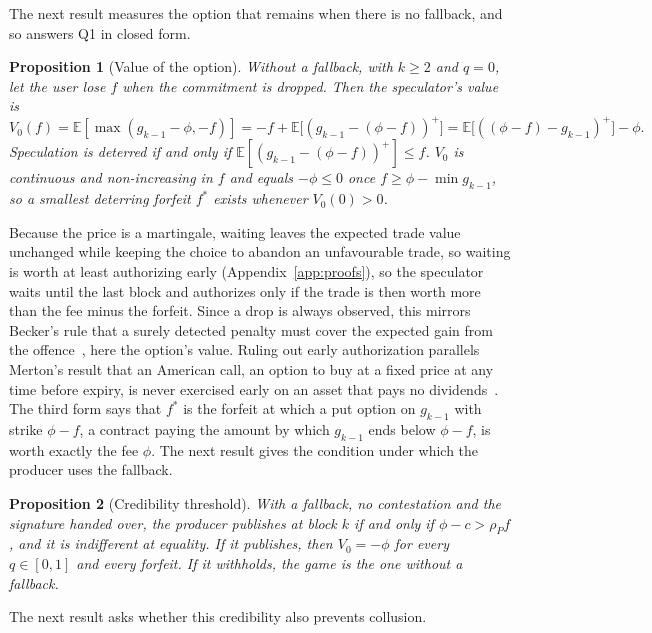 \documentclass[11pt]{article}
\newtheorem{proposition}{Proposition}
\newcommand{\E}{\mathbb{E}}
\begin{document}
The next result measures the option that remains when there is no fallback, and so answers Q1 in closed form.

\begin{proposition}[Value of the option]\label{prop:value}
Without a fallback, with $k\ge2$ and $q=0$, let the user lose $f$ when the commitment is dropped. Then the speculator's value is
\[V_0(f)=\E[\max(g_{k-1}-\phi,-f)]=-f+\E\big[(g_{k-1}-(\phi-f))^+\big]=\E\big[((\phi-f)-g_{k-1})^+\big]-\phi .\]
Speculation is deterred if and only if $\E[(g_{k-1}-(\phi-f))^+]\le f$. $V_0$ is continuous and non-increasing in $f$ and equals $-\phi\le0$ once $f\ge\phi-\min g_{k-1}$, so a smallest deterring forfeit $f^*$ exists whenever $V_0(0)>0$.
\end{proposition}
Because the price is a martingale, waiting leaves the expected trade value unchanged while keeping the choice to abandon an unfavourable trade, so waiting is worth at least authorizing early (Appendix~\ref{app:proofs}), so the speculator waits until the last block and authorizes only if the trade is then worth more than the fee minus the forfeit. Since a drop is always observed, this mirrors Becker's rule that a surely detected penalty must cover the expected gain from the offence~\cite{becker1968crime}, here the option's value. Ruling out early authorization parallels Merton's result that an American call, an option to buy at a fixed price at any time before expiry, is never exercised early on an asset that pays no dividends~\cite{merton1973}. The third form says that $f^*$ is the forfeit at which a put option on $g_{k-1}$ with strike $\phi-f$, a contract paying the amount by which $g_{k-1}$ ends below $\phi-f$, is worth exactly the fee $\phi$. The next result gives the condition under which the producer uses the fallback.

\begin{proposition}[Credibility threshold]\label{prop:cred}
With a fallback, no contestation and the signature handed over, the producer publishes at block $k$ if and only if $\phi-c>\rho_P f$, and it is indifferent at equality. If it publishes, then $V_0=-\phi$ for every $q\in[0,1]$ and every forfeit. If it withholds, the game is the one without a fallback.
\end{proposition}


The next result asks whether this credibility also prevents collusion.
\end{document}
